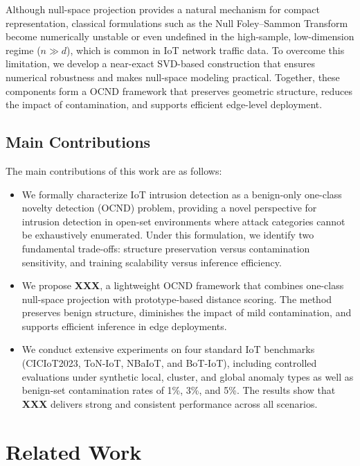 \documentclass[final,twocolumn,10pt]{elsarticle}
\begin{document}
Although null-space projection provides a natural mechanism for compact representation, classical formulations such as the Null Foley–Sammon Transform become numerically unstable or even undefined in the high-sample, low-dimension regime ($n \gg d$), which is common in IoT network traffic data. To overcome this limitation, we develop a near-exact SVD-based construction that ensures numerical robustness and makes null-space modeling practical. Together, these components form a OCND framework that preserves geometric structure, reduces the impact of contamination, and supports efficient edge-level deployment.



\subsection{Main Contributions}
The main contributions of this work are as follows:
\begin{itemize} 
\item We formally characterize IoT intrusion detection as a benign-only one-class novelty detection (OCND) problem, providing a novel perspective for intrusion detection in open-set environments where attack categories cannot be exhaustively enumerated. Under this formulation, we identify two fundamental trade-offs: structure preservation versus contamination sensitivity, and training scalability versus inference efficiency.

\item We propose \textbf{XXX}, a lightweight OCND framework that combines one-class null-space projection with prototype-based distance scoring. The method preserves benign structure, diminishes the impact of mild contamination, and supports efficient inference in edge deployments. 

\item We conduct extensive experiments on four standard IoT benchmarks (CICIoT2023, ToN-IoT, NBaIoT, and BoT-IoT), including controlled evaluations under synthetic local, cluster, and global anomaly types as well as benign-set contamination rates of 1\%, 3\%, and 5\%. The results show that \textbf{XXX} delivers strong and consistent performance across all scenarios. 
\end{itemize}

\section{Related Work}
\label{sec:relatework}
\end{document}
